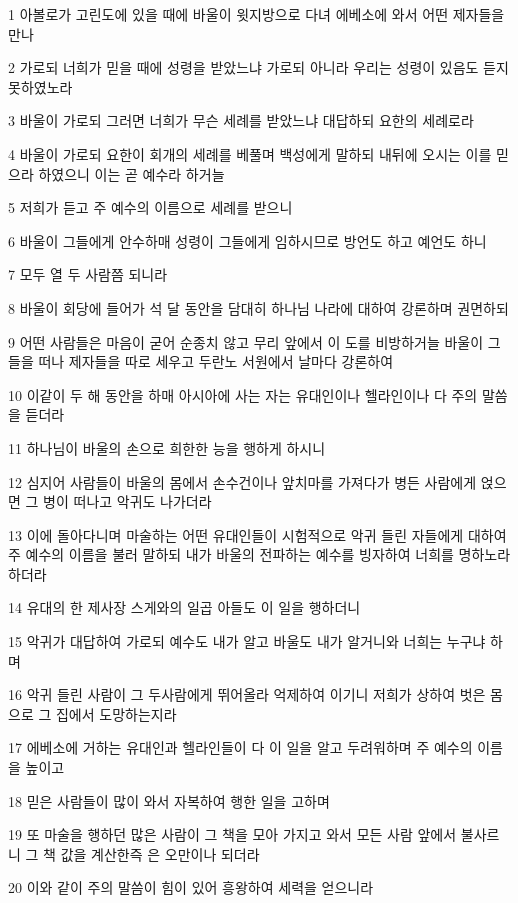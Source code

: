 \par 1 아볼로가 고린도에 있을 때에 바울이 윗지방으로 다녀 에베소에 와서 어떤 제자들을 만나
\par 2 가로되 너희가 믿을 때에 성령을 받았느냐 가로되 아니라 우리는 성령이 있음도 듣지 못하였노라
\par 3 바울이 가로되 그러면 너희가 무슨 세례를 받았느냐 대답하되 요한의 세례로라
\par 4 바울이 가로되 요한이 회개의 세례를 베풀며 백성에게 말하되 내뒤에 오시는 이를 믿으라 하였으니 이는 곧 예수라 하거늘
\par 5 저희가 듣고 주 예수의 이름으로 세례를 받으니
\par 6 바울이 그들에게 안수하매 성령이 그들에게 임하시므로 방언도 하고 예언도 하니
\par 7 모두 열 두 사람쯤 되니라
\par 8 바울이 회당에 들어가 석 달 동안을 담대히 하나님 나라에 대하여 강론하며 권면하되
\par 9 어떤 사람들은 마음이 굳어 순종치 않고 무리 앞에서 이 도를 비방하거늘 바울이 그들을 떠나 제자들을 따로 세우고 두란노 서원에서 날마다 강론하여
\par 10 이같이 두 해 동안을 하매 아시아에 사는 자는 유대인이나 헬라인이나 다 주의 말씀을 듣더라
\par 11 하나님이 바울의 손으로 희한한 능을 행하게 하시니
\par 12 심지어 사람들이 바울의 몸에서 손수건이나 앞치마를 가져다가 병든 사람에게 얹으면 그 병이 떠나고 악귀도 나가더라
\par 13 이에 돌아다니며 마술하는 어떤 유대인들이 시험적으로 악귀 들린 자들에게 대하여 주 예수의 이름을 불러 말하되 내가 바울의 전파하는 예수를 빙자하여 너희를 명하노라 하더라
\par 14 유대의 한 제사장 스게와의 일곱 아들도 이 일을 행하더니
\par 15 악귀가 대답하여 가로되 예수도 내가 알고 바울도 내가 알거니와 너희는 누구냐 하며
\par 16 악귀 들린 사람이 그 두사람에게 뛰어올라 억제하여 이기니 저희가 상하여 벗은 몸으로 그 집에서 도망하는지라
\par 17 에베소에 거하는 유대인과 헬라인들이 다 이 일을 알고 두려워하며 주 예수의 이름을 높이고
\par 18 믿은 사람들이 많이 와서 자복하여 행한 일을 고하며
\par 19 또 마술을 행하던 많은 사람이 그 책을 모아 가지고 와서 모든 사람 앞에서 불사르니 그 책 값을 계산한즉 은 오만이나 되더라
\par 20 이와 같이 주의 말씀이 힘이 있어 흥왕하여 세력을 얻으니라
